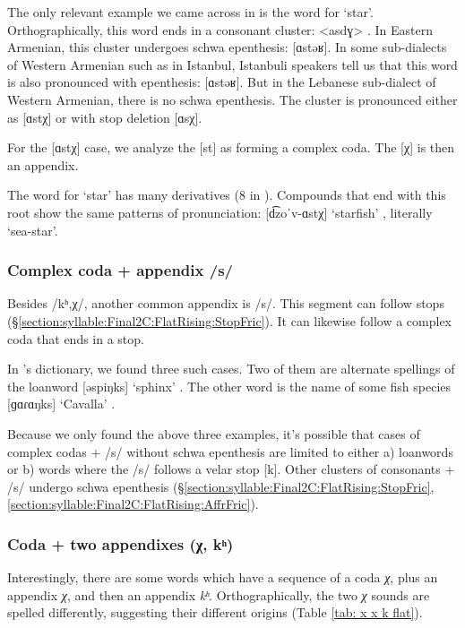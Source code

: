 	The only relevant example we came across in \citeauthor{kouyoumdjian-1970-DictionaryArmenianEnglish} is the word for `star'. Orthographically, this word ends in a consonant cluster: <asdɣ> . In Eastern Armenian, this cluster undergoes schwa epenthesis: [ɑstəʁ]. In some sub-dialects of Western Armenian such as in Istanbul, Istanbuli speakers tell us that this word is also pronounced with epenthesis:  [ɑstəʁ]. But in the Lebanese sub-dialect of Western Armenian, there is no schwa epenthesis. The cluster is pronounced either as [ɑstχ] or with stop deletion [ɑsχ]. 
	
	For the [ɑstχ] case, we analyze the [st] as forming a complex coda. The [χ] is then an appendix. 
	
	The word for `star' has many derivatives (8 in \citeauthor{kouyoumdjian-1970-DictionaryArmenianEnglish}). Compounds that end with this root show the same patterns of pronunciation: [d͡zoˈv-ɑstχ] `starfish' , literally `sea-star'. 
	
	\subsubsection{Complex coda +   appendix /s/}\label{section:syllable:Final3C:Appendix:S}
	Besides /kʰ,χ/, another common appendix is /s/. This segment can follow stops (\S\ref{section:syllable:Final2C:FlatRising:StopFric}). It can likewise follow a complex coda that ends in a stop. 
	
	In \citeauthor{kouyoumdjian-1970-DictionaryArmenianEnglish}'s dictionary, we found three such cases. Two of them are alternate spellings of the loanword [əspiŋks] `sphinx' . The other word is the name of some fish species [ɡɑɾɑŋks] `Cavalla' . 
	
	Because we only found the above three examples, it's possible that cases of complex codas + /s/  without schwa epenthesis are limited to either a) loanwords or b) words where the /s/ follows a velar stop [k]. Other clusters of consonants + /s/ undergo schwa epenthesis (\S\ref{section:syllable:Final2C:FlatRising:StopFric},\ref{section:syllable:Final2C:FlatRising:AffrFric}). 
	
	\subsubsection{Coda + two appendixes (χ, kʰ)}\label{section:syllable:Final3C:Appendix:TwoAppendix}
	
	Interestingly, there are some words which have a sequence of a coda \textit{χ}, plus an appendix \textit{χ}, and then an appendix \textit{kʰ}. Orthographically, the two \textit{χ} sounds are spelled differently, suggesting their different origins (Table \ref{tab: x x k flat}). 
	

